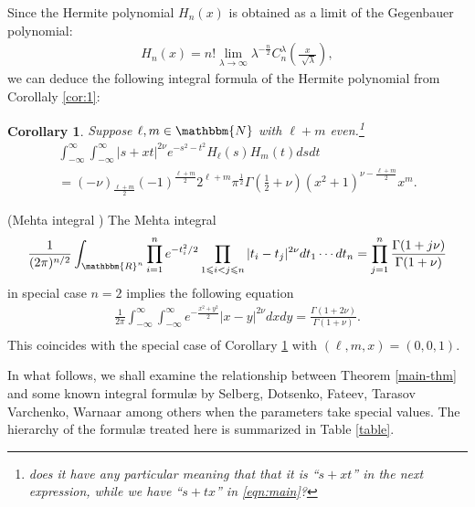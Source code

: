 \documentclass[12pt]{article}
\numberwithin{equation}{section}
\newtheorem{corollary}{Corollary}[section]
{\theorembodyfont{\rmfamily}\newtheorem{example}[corollary]{Example}}
\begin{document}
Since the Hermite polynomial $H_n (x)$ is obtained as a limit of the
Gegenbauer polynomial:
\begin{eqnarray}
  & H_n (x) = n! \displaystyle\lim_{\lambda \rightarrow \infty} \lambda^{- \frac{n}{2}}
  C_n^{\lambda} \left( \displaystyle\frac{x}{\sqrt[]{\lambda}} \right), &  \nonumber
\end{eqnarray}
we can deduce the following integral formula of the Hermite polynomial from
Corollaly \ref{cor:1}:

\begin{corollary}
  \label{cor:Hermite}Suppose $\ell, m \in \mathbbm{N}$ with $\ell + m$
  even.\footnote{does it have any particular meaning that that it is ``$s+xt$'' in the next expression, while we have ``$s+tx$''
	  in \eqref{eqn:main}?}
  \begin{multline}
     \displaystyle\int_{- \infty}^{\infty} \displaystyle\int_{- \infty}^{\infty} | s+xt |^{2 \nu}
    e^{- s^2 - t^2} H_{\ell} (s) H_m (t) d s d t \\= (- \nu)_{\frac{\ell +
    m}{2}} (- 1)^{\frac{\ell + m}{2}} 2^{\ell + m} \pi^{\frac{1}{2}} \Gamma
    \left( \frac{1}{2} + \nu \right) (x^2 + 1)^{\nu - \frac{\ell + m}{2}} x^m.
    \end{multline}
\end{corollary}

\begin{example}
  (Mehta integral {\cite{mehta2004random}}) The Mehta integral
  \begin{equation*}
     \frac{1}{(2 \pi)^{n / 2}} \displaystyle\int_{\mathbbm{R}^n} \displaystyle\prod_{i = 1}^n e^{-
    t_i^2 / 2}_{} \displaystyle\prod_{1 \leqslant i < j \leqslant n} | t_i - t_j |^{2 \nu}
    d t_1 \cdots d t_n
     = \displaystyle\prod_{j = 1}^n \frac{\Gamma (1 + j \nu)}{\Gamma (1 + \nu)}
  \end{equation*}
  in special case $n = 2$ implies the following equation
  \begin{eqnarray}
    & \displaystyle\frac{1}{2 \pi} \displaystyle\int_{- \infty}^{\infty} \displaystyle\int_{- \infty}^{\infty} e^{-
    \frac{x^2 + y^2}{2}} | x - y |^{2 \nu} d x d y = \frac{\Gamma (1 + 2
    \nu)}{\Gamma (1 + \nu)} . &  \nonumber\\
    &  &  \nonumber
  \end{eqnarray}
  This coincides with the special case of Corollary \ref{cor:Hermite} with
  $(\ell, m, x) = (0, 0, 1)$.
\end{example}

In what follows, we shall examine the relationship between Theorem
\ref{main-thm} and some known integral formul{\ae} by Selberg, Dotsenko,
Fateev, Tarasov Varchenko, Warnaar among others when the parameters take
special values. The hierarchy of the formul{\ae} treated here is summarized in
Table \ref{table}.
\end{document}
